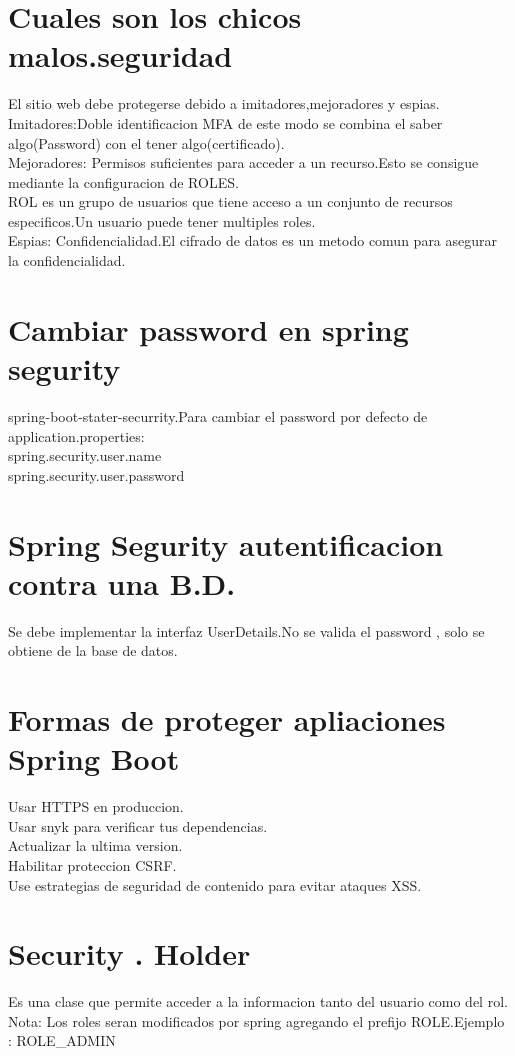 \section{Cuales son los chicos malos.seguridad}
El sitio web debe protegerse debido a imitadores,mejoradores y espias.\\
Imitadores:Doble identificacion MFA de este modo se combina el saber algo(Password) con el tener algo(certificado).\\
Mejoradores: Permisos suficientes para acceder a un recurso.Esto se consigue mediante la configuracion de ROLES.\\
ROL es un grupo de usuarios que tiene acceso a un conjunto de recursos especificos.Un usuario puede tener multiples roles.\\
Espias: Confidencialidad.El cifrado de datos es un metodo comun para asegurar la confidencialidad.
\section{Cambiar password en spring segurity}
spring-boot-stater-securrity.Para cambiar el password por defecto de application.properties:\\
spring.security.user.name\\
spring.security.user.password
\section{Spring Segurity autentificacion contra una B.D.}
Se debe implementar la interfaz UserDetails.No se valida el password , solo se obtiene de la base de datos.
\section{Formas de proteger apliaciones Spring Boot}
Usar HTTPS en produccion.\\
Usar snyk para verificar tus dependencias.\\
Actualizar la ultima version.\\
Habilitar proteccion CSRF.\\
Use estrategias de seguridad de contenido para evitar ataques XSS.
\section{Security . Holder}
Es una clase que permite acceder a la informacion tanto del usuario como del rol.\\
Nota: Los roles seran modificados por spring agregando el prefijo ROLE.Ejemplo : ROLE\_ADMIN
